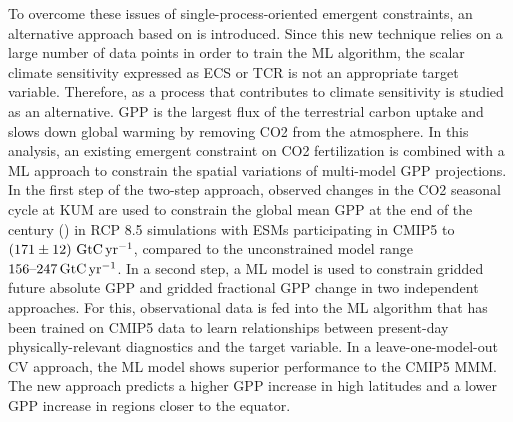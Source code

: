 To overcome these issues of single-process-oriented emergent constraints, an
alternative approach based on  is introduced. Since this new
technique relies on a large number of data points in order to train the
\acs{ML} algorithm, the scalar climate sensitivity expressed as \acs{ECS} or
\acs{TCR} is not an appropriate target variable. Therefore, 
as a process that contributes to climate sensitivity is studied as an
alternative. \acs{GPP} is the largest flux of the terrestrial carbon uptake and
slows down global warming by removing \acs{CO2} from the atmosphere. In this
analysis, an existing emergent constraint on \acs{CO2} fertilization is
combined with a \acs{ML} approach to constrain the spatial variations of
multi-model \acs{GPP} projections. In the first step of the two-step approach,
observed changes in the \acs{CO2} seasonal cycle at \acl{KUM} are used to
constrain the global mean \acs{GPP} at the end of the  century
() in \acl{RCP} 8.5 simulations with \acsp{ESM} participating
in \acs{CMIP}5 to $\pmrangeunit{171}{12}{\GtCyr{}}$, compared to the
unconstrained model range $\rangeunit{156}{247}{\GtCyr{}}$. In a second step, a
\acs{ML} model is used to constrain gridded future absolute \acs{GPP} and
gridded fractional \acs{GPP} change in two independent approaches. For this,
observational data is fed into the \acs{ML} algorithm that has been trained on
\acs{CMIP}5 data to learn relationships between present-day physically-relevant
diagnostics and the target variable. In a leave-one-model-out \acl{CV}
approach, the \acs{ML} model shows superior performance to the \acs{CMIP}5
\acs{MMM}. The new approach predicts a higher \acs{GPP} increase in high
latitudes and a lower \acs{GPP} increase in regions closer to the equator.
